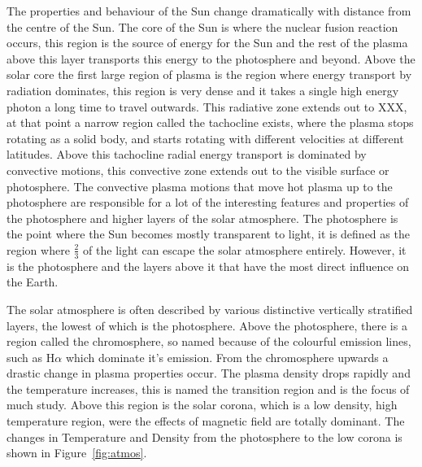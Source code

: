 The properties and behaviour of the Sun change dramatically with distance from the centre of the Sun.
The core of the Sun is where the nuclear fusion reaction occurs, this region is the source of energy for the Sun and the rest of the plasma above this layer transports this energy to the photosphere and beyond.
Above the solar core the first large region of plasma is the region where energy transport by radiation dominates, this region is very dense and it takes a single high energy photon a long time to travel outwards.
This radiative zone extends out to XXX, at that point a narrow region called the tachocline exists, where the plasma stops rotating as a solid body, and starts rotating with different velocities at different latitudes.
Above this tachocline radial energy transport is dominated by convective motions, this convective zone extends out to the visible surface or photosphere.
The convective plasma motions that move hot plasma up to the photosphere are responsible for a lot of the interesting features and properties of the photosphere and higher layers of the solar atmosphere.
The photosphere is the point where the Sun becomes mostly transparent to light, it is defined as the region where $\frac{2}{3}$ of the light can escape the solar atmosphere entirely.
However, it is the photosphere and the layers above it that have the most direct influence on the Earth.

The solar atmosphere is often described by various distinctive vertically stratified layers, the lowest of which is the photosphere.
Above the photosphere, there is a region called the chromosphere, so named because of the colourful emission lines, such as H$\alpha$ which dominate it's emission.
From the chromosphere upwards a drastic change in plasma properties occur.
The plasma density drops rapidly and the temperature increases, this is named the transition region and is the focus of much study.
Above this region is the solar corona, which is a low density, high temperature region, were the effects of magnetic field are totally dominant.
The changes in Temperature and Density from the photosphere to the low corona is shown in Figure~\ref{fig:atmos}.

